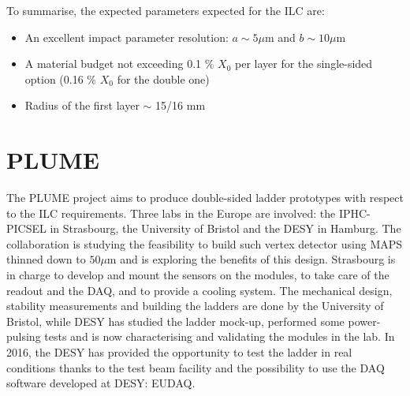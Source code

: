   
   
   


   To summarise, the expected parameters expected for the \gls{ILC} are: 
   \begin{itemize}
     \item An excellent impact parameter resolution: $ a \sim 5 \mu\text{m}$ and $b \sim 10 \mu\text{m}$
     \item A material budget not exceeding 0.1 \% $X_0$ per layer for the single-sided option (0.16 \% $X_0$ for the double one)
     \item Radius of the first layer $\sim$ 15/16 mm
   \end{itemize}

  \section{PLUME}

  The \acrfull{PLUME} project aims to produce double-sided ladder prototypes with respect to the \gls{ILC} requirements\cite{PLUME}.
  Three labs in the Europe are involved: the IPHC-PICSEL in Strasbourg, the University of Bristol and the DESY in Hamburg.
  The collaboration is studying the feasibility to build such vertex detector using \gls{MAPS} thinned down to $50 \mu\text{m}$ and is exploring the benefits of this design.
  Strasbourg is in charge to develop and mount the sensors on the modules, to take care of the readout and the \gls{DAQ}, and to provide a cooling system.
  The mechanical design, stability measurements and building the ladders are done by the University of Bristol, while DESY has studied the ladder mock-up, performed some power-pulsing tests and is now characterising and validating the modules in the lab.
  In 2016, the DESY has provided the opportunity to test the ladder in real conditions thanks to the test beam facility and the possibility to use the \gls{DAQ} software developed at DESY: EUDAQ.

